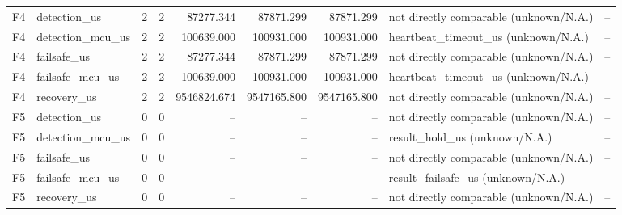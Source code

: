 \begin{tabular}{llrrrrrlr}
F4 & detection\_us & 2 & 2 & 87277.344 & 87871.299 & 87871.299 & not directly comparable (unknown/N.A.) & -- \\
F4 & detection\_mcu\_us & 2 & 2 & 100639.000 & 100931.000 & 100931.000 & heartbeat\_timeout\_us (unknown/N.A.) & -- \\
F4 & failsafe\_us & 2 & 2 & 87277.344 & 87871.299 & 87871.299 & not directly comparable (unknown/N.A.) & -- \\
F4 & failsafe\_mcu\_us & 2 & 2 & 100639.000 & 100931.000 & 100931.000 & heartbeat\_timeout\_us (unknown/N.A.) & -- \\
F4 & recovery\_us & 2 & 2 & 9546824.674 & 9547165.800 & 9547165.800 & not directly comparable (unknown/N.A.) & -- \\
F5 & detection\_us & 0 & 0 & -- & -- & -- & not directly comparable (unknown/N.A.) & -- \\
F5 & detection\_mcu\_us & 0 & 0 & -- & -- & -- & result\_hold\_us (unknown/N.A.) & -- \\
F5 & failsafe\_us & 0 & 0 & -- & -- & -- & not directly comparable (unknown/N.A.) & -- \\
F5 & failsafe\_mcu\_us & 0 & 0 & -- & -- & -- & result\_failsafe\_us (unknown/N.A.) & -- \\
F5 & recovery\_us & 0 & 0 & -- & -- & -- & not directly comparable (unknown/N.A.) & -- \\
\end{tabular}
